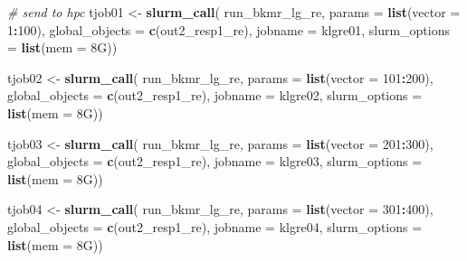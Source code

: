 \documentclass[12pt, twoside]{amherstthesis}
\newenvironment{Shaded}{\begin{snugshade}}{\end{snugshade}}
\newcommand{\AttributeTok}[1]{\textcolor[rgb]{0.13,0.29,0.53}{#1}}
\newcommand{\CommentTok}[1]{\textcolor[rgb]{0.56,0.35,0.01}{\textit{#1}}}
\newcommand{\DecValTok}[1]{\textcolor[rgb]{0.00,0.00,0.81}{#1}}
\newcommand{\FunctionTok}[1]{\textcolor[rgb]{0.13,0.29,0.53}{\textbf{#1}}}
\newcommand{\NormalTok}[1]{#1}
\newcommand{\OtherTok}[1]{\textcolor[rgb]{0.56,0.35,0.01}{#1}}
\newcommand{\SpecialCharTok}[1]{\textcolor[rgb]{0.81,0.36,0.00}{\textbf{#1}}}
\newcommand{\StringTok}[1]{\textcolor[rgb]{0.31,0.60,0.02}{#1}}
\begin{document}
\begin{Shaded}
\begin{Highlighting}[]
\CommentTok{\# send to hpc}
\NormalTok{tjob01 }\OtherTok{\textless{}{-}} \FunctionTok{slurm\_call}\NormalTok{(}
\NormalTok{  run\_bkmr\_lg\_re, }\AttributeTok{params =} \FunctionTok{list}\NormalTok{(}\AttributeTok{vector =} \DecValTok{1}\SpecialCharTok{:}\DecValTok{100}\NormalTok{),}
  \AttributeTok{global\_objects =} \FunctionTok{c}\NormalTok{(}\StringTok{\textquotesingle{}out2\_resp1\_re\textquotesingle{}}\NormalTok{),}
  \AttributeTok{jobname =} \StringTok{\textquotesingle{}klgre01\textquotesingle{}}\NormalTok{,}
  \AttributeTok{slurm\_options =} \FunctionTok{list}\NormalTok{(}\AttributeTok{mem =} \StringTok{\textquotesingle{}8G\textquotesingle{}}\NormalTok{))}

\NormalTok{tjob02 }\OtherTok{\textless{}{-}} \FunctionTok{slurm\_call}\NormalTok{(}
\NormalTok{  run\_bkmr\_lg\_re, }\AttributeTok{params =} \FunctionTok{list}\NormalTok{(}\AttributeTok{vector =} \DecValTok{101}\SpecialCharTok{:}\DecValTok{200}\NormalTok{),}
  \AttributeTok{global\_objects =} \FunctionTok{c}\NormalTok{(}\StringTok{\textquotesingle{}out2\_resp1\_re\textquotesingle{}}\NormalTok{),}
  \AttributeTok{jobname =} \StringTok{\textquotesingle{}klgre02\textquotesingle{}}\NormalTok{,}
  \AttributeTok{slurm\_options =} \FunctionTok{list}\NormalTok{(}\AttributeTok{mem =} \StringTok{\textquotesingle{}8G\textquotesingle{}}\NormalTok{))}

\NormalTok{tjob03 }\OtherTok{\textless{}{-}} \FunctionTok{slurm\_call}\NormalTok{(}
\NormalTok{  run\_bkmr\_lg\_re, }\AttributeTok{params =} \FunctionTok{list}\NormalTok{(}\AttributeTok{vector =} \DecValTok{201}\SpecialCharTok{:}\DecValTok{300}\NormalTok{),}
  \AttributeTok{global\_objects =} \FunctionTok{c}\NormalTok{(}\StringTok{\textquotesingle{}out2\_resp1\_re\textquotesingle{}}\NormalTok{),}
  \AttributeTok{jobname =} \StringTok{\textquotesingle{}klgre03\textquotesingle{}}\NormalTok{,}
  \AttributeTok{slurm\_options =} \FunctionTok{list}\NormalTok{(}\AttributeTok{mem =} \StringTok{\textquotesingle{}8G\textquotesingle{}}\NormalTok{))}

\NormalTok{tjob04 }\OtherTok{\textless{}{-}} \FunctionTok{slurm\_call}\NormalTok{(}
\NormalTok{  run\_bkmr\_lg\_re, }\AttributeTok{params =} \FunctionTok{list}\NormalTok{(}\AttributeTok{vector =} \DecValTok{301}\SpecialCharTok{:}\DecValTok{400}\NormalTok{),}
  \AttributeTok{global\_objects =} \FunctionTok{c}\NormalTok{(}\StringTok{\textquotesingle{}out2\_resp1\_re\textquotesingle{}}\NormalTok{),}
  \AttributeTok{jobname =} \StringTok{\textquotesingle{}klgre04\textquotesingle{}}\NormalTok{,}
  \AttributeTok{slurm\_options =} \FunctionTok{list}\NormalTok{(}\AttributeTok{mem =} \StringTok{\textquotesingle{}8G\textquotesingle{}}\NormalTok{))}
\end{Highlighting}
\end{Shaded}
\normalsize
\end{document}

